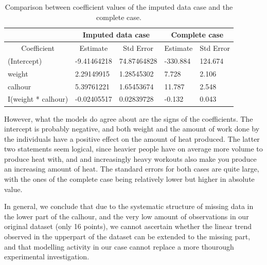 \documentclass[11pt, a4paper]{article}
\begin{document}
\begin{table}[H]
\centering
\begin{tabular}{l|l|l|l|l|}
\cline{2-5}
                                          & \multicolumn{2}{c|}{Imputed data case}                         & \multicolumn{2}{c|}{Complete case}                             \\ \hline
\multicolumn{1}{|c|}{Coefficient}         & \multicolumn{1}{c|}{Estimate} & \multicolumn{1}{c|}{Std Error} & \multicolumn{1}{c|}{Estimate} & \multicolumn{1}{c|}{Std Error} \\ \hline
\multicolumn{1}{|l|}{(Intercept)}         & -9.41464218                   & 74.87464828                    & -330.884                      & 124.674                        \\ \hline
\multicolumn{1}{|l|}{weight}              & 2.29149915                    & 1.28545302                     & 7.728                         & 2.106                          \\ \hline
\multicolumn{1}{|l|}{calhour}             & 5.39761221                    & 1.65453674                     & 11.787                        & 2.548                          \\ \hline
\multicolumn{1}{|l|}{I(weight * calhour)} & -0.02405517                   & 0.02839728                     & -0.132                        & 0.043                          \\ \hline
\end{tabular}
\caption{Comparison between coefficient values of the imputed data case and the complete case.}
\label{tab:comparison}
\end{table}

However, what the models do agree about are the signs of the
coefficients. The intercept is probably negative, and both weight and
the amount of work done by the individuals have a positive effect on
the amount of heat produced. The latter two statements seem logical,
since heavier people have on average more volume to produce heat with,
and and increasingly heavy workouts also make you produce an
increasing amount of heat. The standard errors for both cases are
quite large, with the ones of the complete case being relatively lower
but higher in absolute value.

In general, we conclude that due to the systematic structure of
missing data in the lower part of the calhour, and the very low amount
of observations in our original dataset (only 16 points), we cannot
ascertain whether the linear trend observed in the upperpart of the
dataset can be extended to the missing part, and that modelling
activity in our case cannot replace a more thourough experimental
investigation.
\end{document}
